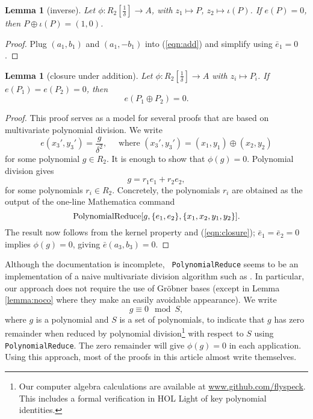 \documentclass[12pt]{article}
\newtheorem{lemma}[theorem]{Lemma}
\newcommand{\op}[1]{\hbox{#1}}
\newcommand{\f}[1]{\frac{1}{#1}}
\def\cong{\equiv}
\begin{document}
\begin{lemma} [inverse] 
  Let $\phi:R_2[\f{\delta}]\to A$, with $z_1\mapsto P$, $z_2\mapsto \iota(P)$.
  If $e(P)=0$, then $P\oplus \iota(P) = (1,0)$.
\end{lemma}

\begin{proof} Plug $(a_1,b_1)$ and $(a_1,-b_1)$ into (\ref{eqn:add})
  and simplify using $\bar e_1=0$.
\end{proof}

\begin{lemma}[closure under addition]\label{lemma:closure}
  Let $\phi:R_2[\f{\delta}]\to A$ with $z_i\mapsto P_i$.
  If $e(P_1)=e(P_2)=0$, then
  \[
  e(P_1 \oplus P_2) = 0.
  \]
\end{lemma}

\begin{proof} This proof serves as a model for several proofs that are
  based on multivariate polynomial division.  We write
\[
e(x_3',y_3') = \frac{g}{\delta^2},\quad \text{ where } 
(x_3',y_3')=(x_1,y_1) \oplus (x_2,y_2) 
\]
for some polynomial $g \in R_2$.  It is enough to show that $\phi(g)=0$.
Polynomial division gives
\begin{equation}\label{eqn:closure}
g= r_1 e_1 + r_2 e_2,
\end{equation}
for some polynomials $r_i\in R_2$.  Concretely, the polynomials $r_i$
are obtained as the output of the one-line Mathematica command
\[
\op{PolynomialReduce}[g,\{e_1,e_2\},\{x_1,x_2,y_1,y_2\}].
\]
The result now follows from the kernel
property and (\ref{eqn:closure}); $\bar e_1 = \bar e_2 = 0$ implies
$\phi(g)= 0$, giving ${\bar e}(a_3,b_3)=0$.
\end{proof}

Although the documentation is incomplete,  {\tt
  PolynomialReduce} seems to be an implementation of a naive
multivariate division algorithm such as \cite{cox1992ideals}.  In
particular, our approach does not require the use of Gr\"obner bases
(except in Lemma \ref{lemma:noco} where they make an easily avoidable
appearance).  We write
\[
g \cong 0 \mod S,
\]
where $g$ is a polynomial and $S$ is a set of polynomials, to indicate
that $g$ has zero remainder when reduced by polynomial
division\footnote{Our computer algebra calculations are available at
  \url{www.github.com/flyspeck}.  This includes a formal verification
  in HOL Light of key polynomial identities.} with respect to $S$
using {\tt PolynomialReduce}.  The zero remainder will give
$\phi(g)=0$ in each application.  Using this approach, most of the
proofs in this article almost write themselves.
\end{document}
